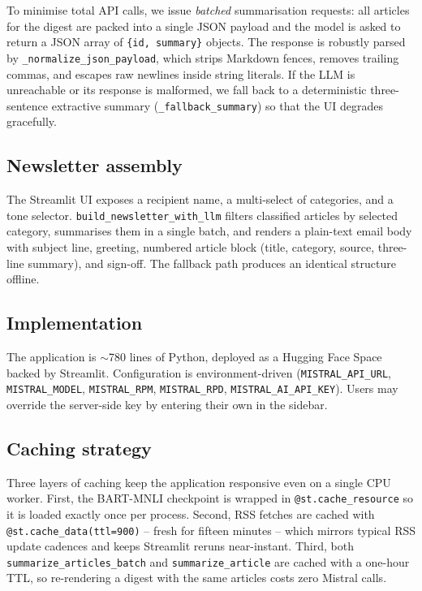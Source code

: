 \documentclass[10pt,twocolumn,letterpaper]{article}
\begin{document}
To minimise total API calls, we issue \emph{batched} summarisation requests: all articles for the digest are packed into a single JSON payload and the model is asked to return a JSON array of \texttt{\{id, summary\}} objects. The response is robustly parsed by \texttt{\_normalize\_json\_payload}, which strips Markdown fences, removes trailing commas, and escapes raw newlines inside string literals. If the LLM is unreachable or its response is malformed, we fall back to a deterministic three-sentence extractive summary (\texttt{\_fallback\_summary}) so that the UI degrades gracefully.

\subsection{Newsletter assembly}
The Streamlit UI exposes a recipient name, a multi-select of categories, and a tone selector. \texttt{build\_newsletter\_with\_llm} filters classified articles by selected category, summarises them in a single batch, and renders a plain-text email body with subject line, greeting, numbered article block (title, category, source, three-line summary), and sign-off. The fallback path produces an identical structure offline.

\subsection{Implementation}
The application is $\sim$780 lines of Python, deployed as a Hugging Face Space backed by Streamlit. Configuration is environment-driven (\texttt{MISTRAL\_API\_URL}, \texttt{MISTRAL\_MODEL}, \texttt{MISTRAL\_RPM}, \texttt{MISTRAL\_RPD}, \texttt{MISTRAL\_AI\_API\_KEY}). Users may override the server-side key by entering their own in the sidebar.

\subsection{Caching strategy}
Three layers of caching keep the application responsive even on a single CPU worker. First, the BART-MNLI checkpoint is wrapped in \texttt{@st.cache\_resource} so it is loaded exactly once per process. Second, RSS fetches are cached with \texttt{@st.cache\_data(ttl=900)} -- fresh for fifteen minutes -- which mirrors typical RSS update cadences and keeps Streamlit reruns near-instant. Third, both \texttt{summarize\_articles\_batch} and \texttt{summarize\_article} are cached with a one-hour TTL, so re-rendering a digest with the same articles costs zero Mistral calls.
\end{document}
